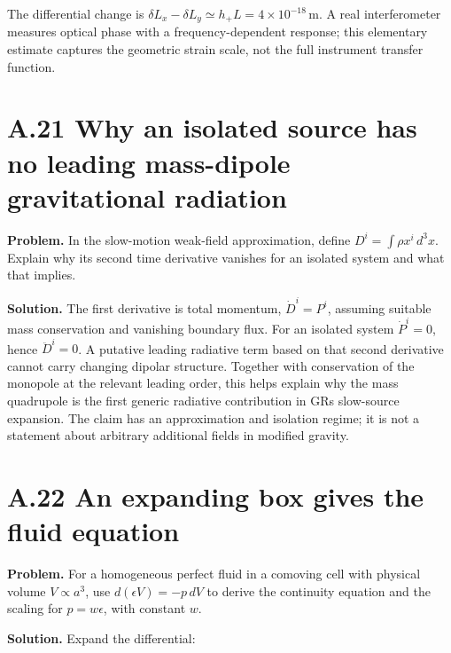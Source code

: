 \documentclass[
  11pt,
  letterpaper,
  oneside,
  openany]{scrbook}
\begin{document}
The differential change is
\(\delta L_x-\delta L_y\simeq h_+L=4\times10^{-18}\,\mathrm m\). A real
interferometer measures optical phase with a frequency-dependent
response; this elementary estimate captures the geometric strain scale,
not the full instrument transfer function.

\hypertarget{a.21-why-an-isolated-source-has-no-leading-mass-dipole-gravitational-radiation}{%
\section{A.21 Why an isolated source has no leading mass-dipole
gravitational
radiation}\label{a.21-why-an-isolated-source-has-no-leading-mass-dipole-gravitational-radiation}}

\textbf{Problem.} In the slow-motion weak-field approximation, define
\(D^i=\int\rho x^i\,d^3x\). Explain why its second time derivative
vanishes for an isolated system and what that implies.

\textbf{Solution.} The first derivative is total momentum,
\(\dot D^i=P^i\), assuming suitable mass conservation and vanishing
boundary flux. For an isolated system \(\dot P^i=0\), hence
\(\ddot D^i=0\). A putative leading radiative term based on that second
derivative cannot carry changing dipolar structure. Together with
conservation of the monopole at the relevant leading order, this helps
explain why the mass quadrupole is the first generic radiative
contribution in GR\textquotesingle s slow-source expansion. The claim
has an approximation and isolation regime; it is not a statement about
arbitrary additional fields in modified gravity.

\hypertarget{a.22-an-expanding-box-gives-the-fluid-equation}{%
\section{A.22 An expanding box gives the fluid
equation}\label{a.22-an-expanding-box-gives-the-fluid-equation}}

\textbf{Problem.} For a homogeneous perfect fluid in a comoving cell
with physical volume \(V\propto a^3\), use \(d(\epsilon V)=-p\,dV\) to
derive the continuity equation and the scaling for \(p=w\epsilon\), with
constant \(w\).

\textbf{Solution.} Expand the differential:

\begin{center}
\begingroup
{}
\ifdim\wd\grmathbox>\linewidth
\resizebox{\linewidth}{!}{\usebox{\grmathbox}}
\else\usebox{\grmathbox}\fi
\endgroup
\end{center}
\end{document}
